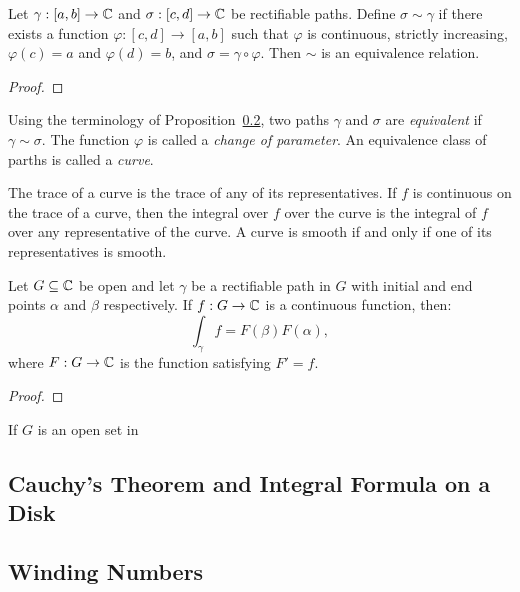 \documentclass[reqno]{amsart}
\begin{document}
\begin{proposition}
	Let $\gamma:[a,b] \rightarrow \mathbb{C}$ and $\sigma:[c,d] \rightarrow \mathbb{C}$ be rectifiable paths. Define $\sigma \sim \gamma$ if there exists a function $\varphi:[c,d] \rightarrow [a,b]$ such that $\varphi$ is continuous, strictly increasing, $\varphi(c) = a$ and $\varphi(d) = b$, and $\sigma = \gamma \circ \varphi$. Then $\sim$ is an equivalence relation.
\end{proposition}
{\color{red}
\begin{proof}
		
\end{proof}}

\begin{definition}
	Using the terminology of Proposition~\ref{}, two paths $\gamma$ and $\sigma$ are \emph{equivalent} if $\gamma \sim \sigma$. The function $\varphi$ is called a \emph{change of parameter}. An equivalence class of parths is called a \emph{curve}.
\end{definition}

\begin{remark}
	The trace of a curve is the trace of any of its representatives. If $f$ is continuous on the trace of a curve, then the integral over $f$ over the curve is the integral of $f$ over any representative of the curve. A curve is smooth if and only if one of its representatives is smooth. 
\end{remark}

\begin{theorem}
	Let $G \subseteq \mathbb{C}$ be open and let $\gamma$ be a rectifiable path in $G$ with initial and end points $\alpha$ and $\beta$ respectively. If $f:G \rightarrow \mathbb{C}$ is a continuous function, then:
	\[
		\int_{\gamma}^{}f  = F(\beta) F(\alpha),
	\] 
	where $F:G \rightarrow \mathbb{C}$ is the function satisfying $F' = f$.
\end{theorem}
{\color{red}
\begin{proof}
		
\end{proof}}

\begin{lemma}
	If $G$ is an open set in 
\end{lemma}

\subsection{Cauchy's Theorem and Integral Formula on a Disk}

\subsection{Winding Numbers}
\fi
\end{document}
